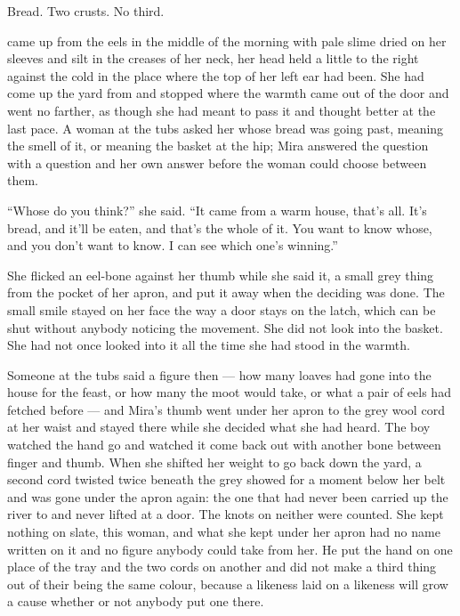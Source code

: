 Bread. Two crusts. No third.

\scenebreak

 came up from the eels in the middle of the morning with pale slime dried on her sleeves and silt in the creases of her neck, her head held a little to the right against the cold in the place where the top of her left ear had been. She had come up the yard from  and stopped where the warmth came out of the door and went no farther, as though she had meant to pass it and thought better at the last pace. A woman at the tubs asked her whose bread was going past, meaning the smell of it, or meaning the basket at the hip; Mira answered the question with a question and her own answer before the woman could choose between them.

“Whose do you think?” she said. “It came from a warm house, that's all. It's bread, and it'll be eaten, and that's the whole of it. You want to know whose, and you don't want to know. I can see which one's winning.”

She flicked an eel-bone against her thumb while she said it, a small grey thing from the pocket of her apron, and put it away when the deciding was done. The small smile stayed on her face the way a door stays on the latch, which can be shut without anybody noticing the movement. She did not look into the basket. She had not once looked into it all the time she had stood in the warmth.

Someone at the tubs said a figure then --- how many loaves had gone into the house for the feast, or how many the moot would take, or what a pair of eels had fetched before  --- and Mira's thumb went under her apron to the grey wool cord at her waist and stayed there while she decided what she had heard. The boy watched the hand go and watched it come back out with another bone between finger and thumb. When she shifted her weight to go back down the yard, a second cord twisted twice beneath the grey showed for a moment below her belt and was gone under the apron again: the one that had never been carried up the river to  and never lifted at a door. The knots on neither were counted. She kept nothing on slate, this woman, and what she kept under her apron had no name written on it and no figure anybody could take from her. He put the hand on one place of the tray and the two cords on another and did not make a third thing out of their being the same colour, because a likeness laid on a likeness will grow a cause whether or not anybody put one there.

